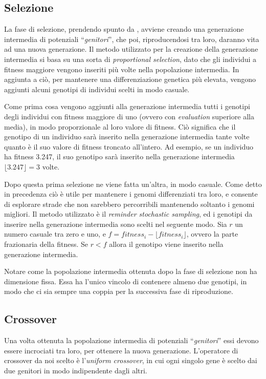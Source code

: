 \documentclass[a4paper,12pt]{article}
\begin{document}
\subsection*{Selezione}
La fase di selezione, prendendo spunto da \cite{arztRepo}, avviene creando una generazione intermedia di potenziali ``\emph{genitori}'', che poi, riproducendosi tra loro, daranno vita ad una nuova generazione. Il metodo utilizzato per la creazione della generazione intermedia si basa su una sorta di \emph{proportional selection}, dato che gli individui a fitness maggiore vengono inseriti più volte nella popolazione intermedia. In aggiunta a ciò, per mantenere una differenziazione genetica più elevata, vengono aggiunti alcuni genotipi di individui scelti in modo casuale.  

Come prima cosa vengono aggiunti alla generazione intermedia tutti i genotipi degli individui con fitness maggiore di uno (ovvero con \emph{evaluation} superiore alla media), in modo proporzionale al loro valore di fitness. Ciò significa che il genotipo di un individuo sarà inserito nella generazione intermedia tante volte quanto è il suo valore di fitness troncato all'intero. Ad esempio, se un individuo ha fitness 3.247, il suo genotipo sarà inserito nella generazione intermedia $\lfloor3.247\rfloor = 3$ volte. 

Dopo questa prima selezione ne viene fatta un'altra, in modo casuale. Come detto in precedenza ciò è utile per mantenere i genomi differenziati tra loro, e consente di esplorare strade che non sarebbero percorribili mantenendo soltanto i genomi migliori. Il metodo utilizzato è il \emph{reminder stochastic sampling}, ed i genotipi da inserire nella generazione intermedia sono scelti nel seguente modo. Sia $r$ un numero casuale tra zero e uno, e $f = fitness_i - \lfloor fitness_i \rfloor$, ovvero la parte frazionaria della fitness. Se $r < f$ allora il genotipo viene inserito nella generazione intermedia.

Notare come la popolazione intermedia ottenuta dopo la fase di selezione non ha dimensione fissa. Essa ha l'unico vincolo di contenere almeno due genotipi, in modo che ci sia sempre una coppia per la successiva fase di riproduzione.
\subsection*{Crossover} \label{crossover}
Una volta ottenuta la popolazione intermedia di potenziali ``\emph{genitori}'' essi devono essere incrociati tra loro, per ottenere la nuova generazione. L'operatore di crossover da noi scelto è l'\emph{uniform crossover}, in cui ogni singolo gene è scelto dai due genitori in modo indipendente dagli altri. 
\end{document}
